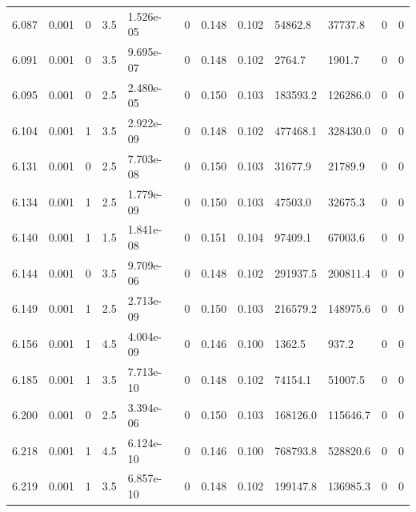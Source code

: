 \documentclass[preview]{standalone}
\begin{document}
{{{{{{{{{{{{{{\begin{tabular}{L{1.2cm}C{1.2cm} C{0.3cm}C{0.5cm} C{1.4cm}C{1.4cm} C{1.4cm}C{1.4cm} C{1.6cm}C{1.6cm} C{1.6cm}C{1.6cm}}
  6.087  &  0.001  & 0     & 3.5 &  1.526e-05  & 0  &  0.148&   0.102& 54862.8 & 37737.8   &  0 & 0  \\ 
  6.091  &  0.001  & 0     & 3.5 &  9.695e-07  & 0  &  0.148&   0.102& 2764.7 & 1901.7   &  0 & 0  \\ 
  6.095  &  0.001  & 0     & 2.5 &  2.480e-05  & 0  &  0.150&   0.103& 183593.2 & 126286.0   &  0 & 0  \\ 
  6.104  &  0.001  & 1     & 3.5 &  2.922e-09  & 0  &  0.148&   0.102& 477468.1 & 328430.0   &  0 & 0  \\ 
  6.131  &  0.001  & 0     & 2.5 &  7.703e-08  & 0  &  0.150&   0.103& 31677.9 & 21789.9   &  0 & 0  \\ 
  6.134  &  0.001  & 1     & 2.5 &  1.779e-09  & 0  &  0.150&   0.103& 47503.0 & 32675.3   &  0 & 0  \\ 
  6.140  &  0.001  & 1     & 1.5 &  1.841e-08  & 0  &  0.151&   0.104& 97409.1 & 67003.6   &  0 & 0  \\ 
  6.144  &  0.001  & 0     & 3.5 &  9.709e-06  & 0  &  0.148&   0.102& 291937.5 & 200811.4   &  0 & 0  \\ 
  6.149  &  0.001  & 1     & 2.5 &  2.713e-09  & 0  &  0.150&   0.103& 216579.2 & 148975.6   &  0 & 0  \\ 
  6.156  &  0.001  & 1     & 4.5 &  4.004e-09  & 0  &  0.146&   0.100& 1362.5 & 937.2   &  0 & 0  \\ 
  6.185  &  0.001  & 1     & 3.5 &  7.713e-10  & 0  &  0.148&   0.102& 74154.1 & 51007.5   &  0 & 0  \\ 
  6.200  &  0.001  & 0     & 2.5 &  3.394e-06  & 0  &  0.150&   0.103& 168126.0 & 115646.7   &  0 & 0  \\ 
  6.218  &  0.001  & 1     & 4.5 &  6.124e-10  & 0  &  0.146&   0.100& 768793.8 & 528820.6   &  0 & 0  \\ 
  6.219  &  0.001  & 1     & 3.5 &  6.857e-10  & 0  &  0.148&   0.102& 199147.8 & 136985.3   &  0 & 0  \\ 
\hline 
\end{tabular} 

}}}}}}}}}}}}}}
\end{document}

